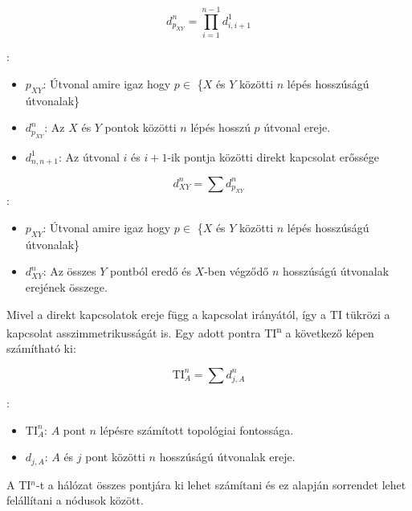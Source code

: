 \documentclass[a4paper,12pt]{article}
\begin{document}
	 \begin{equation}
		d^n_{p_{XY}} =\prod_{i=1}^{n-1} d^1_{i, i+1} 
	 \end{equation}
	 
	 
	 :
	 \begin{itemize}[label=]
		 \item $p_{XY}$: Útvonal amire igaz hogy $p \in$ \{$X$ és $Y$ közötti $n$ lépés hosszúságú útvonalak\}
		 \item $d^n_{p_{XY}}$: Az $X$ és $Y$ pontok közötti $n$ lépés hosszú $p$ útvonal ereje.
		 \item $d^1_{n, n+1}$: Az útvonal $i$ és $i+1$-ik pontja közötti direkt kapcsolat erőssége
	 \end{itemize}
	 
	 
	 \begin{equation}
		 d^n_{XY} = \sum d^{n}_{p_{XY}}
	 \end{equation}
	 :
	 \begin{itemize}[label=]
		\item $p_{XY}$: Útvonal amire igaz hogy $p \in$ \{$X$ és $Y$ közötti $n$ lépés hosszúságú útvonalak\}
		\item $d^n_{XY}$: Az összes $Y$ pontból eredő és $X$-ben végződő $n$ hosszúságú útvonalak erejének összege. 
	 \end{itemize}	 
	 
	 Mivel a direkt kapcsolatok ereje függ a kapcsolat irányától, így a TI tükrözi a kapcsolat asszimmetrikusságát is. Egy adott pontra TI\textsuperscript{n} a következő képen számítható ki:
	 
	 \begin{equation}
		\textrm{TI}^n_A=\sum d^n_{j,A}
	 \end{equation}
	 
	 :
	 \begin{itemize}[label=]
		 \item  $\textrm{TI}^n_A$: $A$ pont $n$ lépésre számított topológiai fontossága.
		 \item  $d_{j,A}$: $A$ és $j$ pont közötti $n$ hosszúságú útvonalak ereje. 
	 \end{itemize}
	 
	A TI$^n$-t a hálózat összes pontjára ki lehet számítani és ez alapján sorrendet lehet felállítani a nódusok között.
	 
\end{document}
